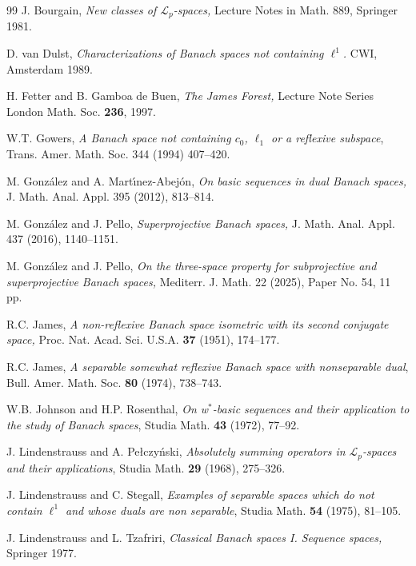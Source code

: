 \documentclass[12pt]{amsart}
\theoremstyle{plain}
\numberwithin{equation}{section}
\newcommand{\Lc}{\mathcal{L}}
\begin{document}
\begin{thebibliography}{99}
 J. Bourgain, \emph{New classes of $\Lc_p$-spaces,} Lecture Notes in Math. 889, Springer 1981.

 D. van Dulst, \emph{Characterizations of Banach spaces not containing $\ell^1$.} CWI, Amsterdam 1989.

 H. Fetter and B. Gamboa de Buen, {\em The James Forest,} Lecture Note Series London Math. Soc. {\bf 236}, 1997.

 W.T. Gowers, \emph{A Banach space not containing $c_0$, $\ell_1$ or a reflexive subspace}, Trans. Amer. Math. Soc. 344 (1994) 407--420.

 M. Gonz\'alez and A. Mart\'\i nez-Abej\'on, \emph{On basic sequences in dual Banach spaces,} J. Math. Anal. Appl.  395 (2012), 813--814.

 M. Gonz\'alez and J. Pello, \emph{Superprojective Banach spaces,} J. Math. Anal. Appl. 437 (2016), 1140--1151.

 M. Gonz\'alez and J. Pello, \emph{On the three-space property for subprojective and superprojective Banach spaces,}  Mediterr. J. Math. 22 (2025), Paper No. 54, 11 pp.

 R.C. James, \emph{A non-reflexive Banach space isometric with its second conjugate space,} Proc. Nat. Acad. Sci. U.S.A. {\bf 37} (1951), 174--177.

 R.C. James, \emph{A separable somewhat reflexive Banach space with nonseparable dual}, Bull. Amer. Math. Soc. {\bf 80} (1974), 738--743.

 W.B. Johnson and H.P. Rosenthal, \emph{On w$^*$-basic sequences and their application to the study of Banach spaces}, Studia Math. {\bf 43} (1972), 77--92.


 J. Lindenstrauss and A. Pe\l czy\'nski, \emph{Absolutely summing operators in $\mathcal{L}_p$-spaces and their applications}, Studia Math. {\bf 29} (1968), 275--326.

 J. Lindenstrauss and C. Stegall, {\em Examples of separable spaces which do not contain $\ell^1$ and whose duals are non separable}, Studia Math. {\bf 54} (1975), 81--105.

 J. Lindenstrauss and L. Tzafriri, \emph{Classical Banach spaces I. Sequence spaces,} Springer 1977.


\end{thebibliography}
\end{document}
